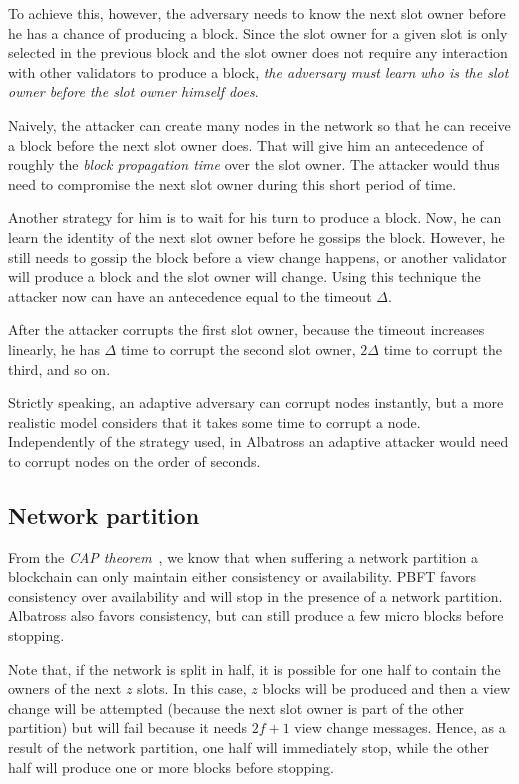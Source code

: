 \documentclass[conference]{IEEEtran}
\begin{document}
To achieve this, however, the adversary needs to know the next slot owner before he has a chance of producing a block. Since the slot owner for a given slot is only selected in the previous block and the slot owner does not require any interaction with other validators to produce a block, \textit{the adversary must learn who is the slot owner before the slot owner himself does}.

Naively, the attacker can create many nodes in the network so that he can receive a block before the next slot owner does. That will give him an antecedence of roughly the \textit{block propagation time} over the slot owner. The attacker would thus need to compromise the next slot owner during this short period of time.

Another strategy for him is to wait for his turn to produce a block. Now, he can learn the identity of the next slot owner before he gossips the block. However, he still needs to gossip the block before a view change happens, or another validator will produce a block and the slot owner will change. Using this technique the attacker now can have an antecedence equal to the timeout $\Delta$.

After the attacker corrupts the first slot owner, because the timeout increases linearly, he has $\Delta$ time to corrupt the second slot owner, $2\Delta$ time to corrupt the third, and so on.

Strictly speaking, an adaptive adversary can corrupt nodes instantly, but a more realistic model considers that it takes some time to corrupt a node. Independently of the strategy used, in Albatross an adaptive attacker would need to corrupt nodes on the order of seconds.

\subsection{Network partition}
From the \textit{CAP theorem}~\cite{gilbert2002brewer}, we know that when suffering a network partition a blockchain can only maintain either consistency or availability. PBFT favors consistency over availability and will stop in the presence of a network partition. Albatross also favors consistency, but can still produce a few micro blocks before stopping.

Note that, if the network is split in half, it is possible for one half to contain the owners of the next $z$ slots. In this case, $z$ blocks will be produced and then a view change will be attempted (because the next slot owner is part of the other partition) but will fail because it needs $2f+1$ view change messages.
Hence, as a result of the network partition, one half will immediately stop, while the other half will produce one or more blocks before stopping.
\end{document}
